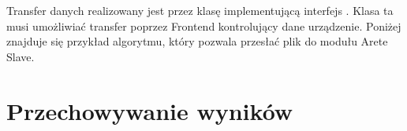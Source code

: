 \documentclass[00-praca-magisterska.tex]{subfiles}
\begin{document}
Transfer danych realizowany jest przez klasę implementującą interfejs
. Klasa ta musi umożliwiać transfer poprzez Frontend kontrolujący
dane urządzenie. Poniżej znajduje się przykład algorytmu, który pozwala przesłać
plik do modułu Arete Slave.


\section{Przechowywanie wyników}

\end{document}
